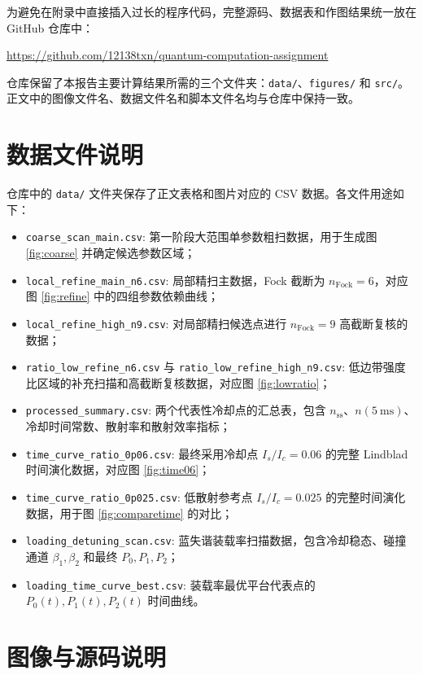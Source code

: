 \documentclass[UTF8,a4paper,12pt]{ctexart}
\begin{document}
为避免在附录中直接插入过长的程序代码，完整源码、数据表和作图结果统一放在 GitHub 仓库中：
\begin{center}
\url{https://github.com/12138txn/quantum-computation-assignment}
\end{center}
仓库保留了本报告主要计算结果所需的三个文件夹：\texttt{data/}、\texttt{figures/} 和 \texttt{src/}。正文中的图像文件名、数据文件名和脚本文件名均与仓库中保持一致。

\section{数据文件说明}

仓库中的 \texttt{data/} 文件夹保存了正文表格和图片对应的 CSV 数据。各文件用途如下：
\begin{itemize}
  \item \texttt{coarse\_scan\_main.csv}: 第一阶段大范围单参数粗扫数据，用于生成图 \ref{fig:coarse} 并确定候选参数区域；
  \item \texttt{local\_refine\_main\_n6.csv}: 局部精扫主数据，Fock 截断为 $n_{\mathrm{Fock}}=6$，对应图 \ref{fig:refine} 中的四组参数依赖曲线；
  \item \texttt{local\_refine\_high\_n9.csv}: 对局部精扫候选点进行 $n_{\mathrm{Fock}}=9$ 高截断复核的数据；
  \item \texttt{ratio\_low\_refine\_n6.csv} 与 \texttt{ratio\_low\_refine\_high\_n9.csv}: 低边带强度比区域的补充扫描和高截断复核数据，对应图 \ref{fig:lowratio}；
  \item \texttt{processed\_summary.csv}: 两个代表性冷却点的汇总表，包含 $n_{\mathrm{ss}}$、$n(5~\mathrm{ms})$、冷却时间常数、散射率和散射效率指标；
  \item \texttt{time\_curve\_ratio\_0p06.csv}: 最终采用冷却点 $I_s/I_c=0.06$ 的完整 Lindblad 时间演化数据，对应图 \ref{fig:time06}；
  \item \texttt{time\_curve\_ratio\_0p025.csv}: 低散射参考点 $I_s/I_c=0.025$ 的完整时间演化数据，用于图 \ref{fig:comparetime} 的对比；
  \item \texttt{loading\_detuning\_scan.csv}: 蓝失谐装载率扫描数据，包含冷却稳态、碰撞通道 $\beta_1,\beta_2$ 和最终 $P_0,P_1,P_2$；
  \item \texttt{loading\_time\_curve\_best.csv}: 装载率最优平台代表点的 $P_0(t),P_1(t),P_2(t)$ 时间曲线。
\end{itemize}

\section{图像与源码说明}
\end{document}

